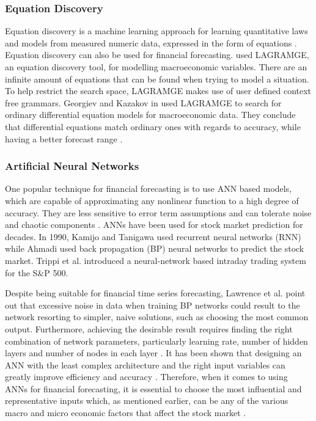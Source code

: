 \documentclass{UoYCSproject}
\begin{document}
\subsubsection{Equation Discovery}
Equation discovery is a machine learning approach for learning quantitative laws and models from measured numeric data, expressed in the form of equations \cite{Todorovski2010}. Equation discovery can also be used for financial forecasting.  \cite{kazakov2008equation}  used LAGRAMGE, an equation discovery tool, for modelling macroeconomic variables. There are an infinite amount of equations that can be found when trying to model a situation. To help restrict the search space, LAGRAMGE makes use of user defined context free grammars. Georgiev and Kazakov in \cite{Georgiev2012Equation} used LAGRAMGE to search for ordinary differential equation models for macroeconomic data. They conclude that differential equations match ordinary ones with regards to accuracy, while having a better forecast range \cite{Kokov2012Equation}.  

\subsubsection{Artificial Neural Networks}
One popular technique for financial forecasting is to use ANN based models, which are capable of approximating any nonlinear function to a high degree of accuracy. They are less sensitive to error term assumptions and can tolerate noise and chaotic components \cite{majhi2007stock}. ANNs have been used for stock market prediction for decades. In 1990, Kamijo and Tanigawa \cite{kamijo1990stock} used recurrent neural networks (RNN) while Ahmadi \cite{ahmadi1990testability} used back propagation (BP) neural networks to predict the stock market. Trippi et al. \cite{trippi1992trading} introduced a neural-network based intraday trading system for the S\&P 500. 

Despite being suitable for financial time series forecasting, Lawrence et al. \cite{lawrence1998noisy} point out that excessive noise in data when training BP networks could result to the network resorting to simpler, naive solutions, such as choosing the most common output. Furthermore, achieving the desirable result requires finding the right combination of network parameters, particularly learning rate, number of hidden layers and number of nodes in each layer \cite{hussain2008financial}. It has been shown that designing an ANN with the least complex architecture and the right input variables can greatly improve efficiency and accuracy \cite{atsalakis2009surveying}. Therefore, when it comes to using ANNs for financial forecasting, it is essential to choose the most influential and representative inputs which, as mentioned earlier, can be any of the various macro and micro economic factors that affect the stock market \cite{zhong2017forecasting}. 
\end{document}
